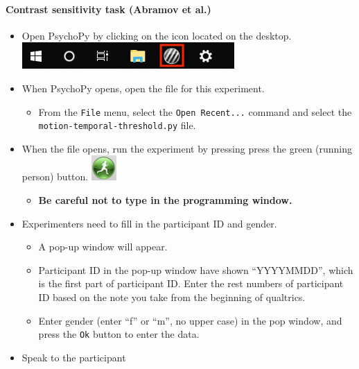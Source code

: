 \documentclass[]{article}
\providecommand{\tightlist}{%
  \setlength{\itemsep}{0pt}\setlength{\parskip}{0pt}}
\let\oldparagraph\paragraph
\renewcommand{\paragraph}[1]{\oldparagraph{#1}\mbox{}}
\begin{document}
\paragraph{Contrast sensitivity task (Abramov et
al.)}\label{contrast-sensitivity-task-abramov-et-al.}

\begin{itemize}
\tightlist
\item
  Open PsychoPy by clicking on the icon located on the desktop.
  \includegraphics{images/PsychoPy-1.PNG}\\
\item
  When PsychoPy opens, open the file for this experiment.

  \begin{itemize}
  \tightlist
  \item
    From the \texttt{File} menu, select the \texttt{Open\ Recent...}
    command and select the \texttt{motion-temporal-threshold.py} file.
  \end{itemize}
\item
  When the file opens, run the experiment by pressing press the green
  (running person) button. \includegraphics{images/PPrunningMan.png}

  \begin{itemize}
  \tightlist
  \item
    \textbf{Be careful not to type in the programming window.}
  \end{itemize}
\item
  Experimenters need to fill in the participant ID and gender.

  \begin{itemize}
  \tightlist
  \item
    A pop-up window will appear.
  \item
    Participant ID in the pop-up window have shown ``YYYYMMDD'', which
    is the first part of participant ID. Enter the rest numbers of
    participant ID based on the note you take from the beginning of
    qualtrics.
  \item
    Enter gender (enter ``f'' or ``m'', no upper case) in the pop
    window, and press the \texttt{Ok} button to enter the data.
  \end{itemize}
\item
  Speak to the participant
\end{itemize}
\end{document}

